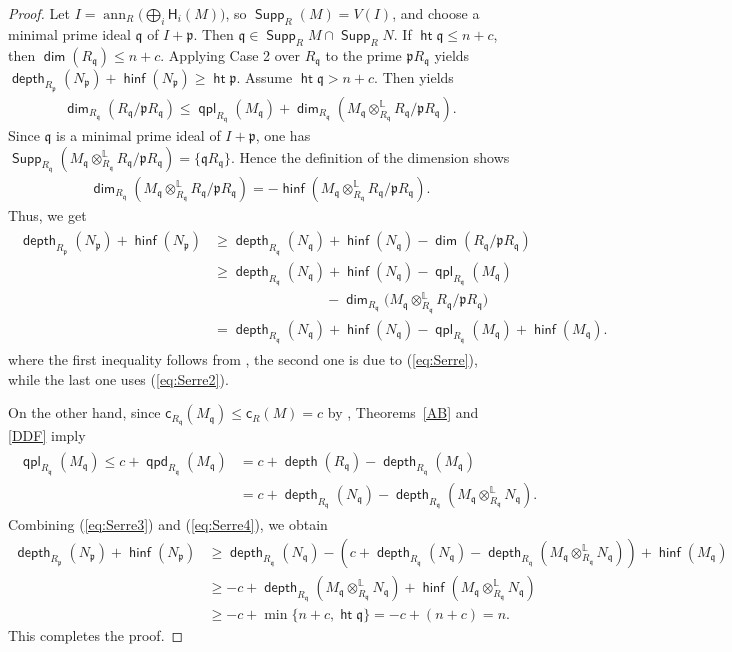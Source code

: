 \documentclass[10pt, a4paper,reqno]{amsart}
\theoremstyle{definition}
\theoremstyle{remark}
\numberwithin{equation}{thm}
\def\fp{\mathfrak{p}}
\def\fq{\mathfrak{q}}
\def\sH{\mathsf{H}}
\def\c{\mathsf{c}}
\def\ann{\operatorname{ann}}
\def\dim{\operatorname{\mathsf{dim}}}
\def\depth{\operatorname{\mathsf{depth}}}
\def\height{\operatorname{\mathsf{ht}}}
\def\Supp{\operatorname{\mathsf{Supp}}}
\def\ltensor{\otimes^{\mathbb{L}}}
\def\hinf{\operatorname{\mathsf{hinf}}}
\def\qpd{\operatorname{\mathsf{qpd}}}
\def\qpl{\operatorname{\mathsf{qpl}}}
\begin{document}
\begin{proof}
Let $I = \ann_R \bigl(\bigoplus_i \sH_i(M)\bigr)$, so $\Supp_R(M)=V(I)$, and choose a minimal prime ideal $\fq$ of $I + \fp$.
Then $\fq\in\Supp_R M\cap\Supp_R N$.
If $\height \fq \le n+c$, then $\dim(R_\fq) \le n+c$. 
Applying Case 2 over $R_\fq$ to the prime $\fp R_\fq$ yields $\depth_{R_\fp}(N_\fp) + \hinf(N_\fp) \ge \height \fp$.
Assume $\height \fq > n+c$.
Then  yields
\begin{align}\label{eq:Serre}
\dim_{R_\fq}(R_\fq/\fp R_\fq) \le \qpl_{R_\fq}(M_\fq) + \dim_{R_\fq}(M_\fq \ltensor_{R_\fq} R_\fq/\fp R_\fq).
\end{align}
Since $\fq$ is a minimal prime ideal of $I + \fp$, one has $\Supp_{R_\fq}(M_\fq \ltensor_{R_\fq} R_\fq/\fp R_\fq)  = \{\fq R_\fq\}$.
Hence the definition of the dimension shows 
\begin{align}\label{eq:Serre2}
\dim_{R_\fq}(M_\fq \ltensor_{R_\fq} R_\fq/\fp R_\fq) = - \hinf(M_\fq \ltensor_{R_\fq} R_\fq/\fp R_\fq).	
\end{align}
Thus, we get 
\begin{align}\label{eq:Serre3}
\begin{split}
\depth_{R_\fp}(N_\fp)+\hinf(N_\fp)
&\geq \depth_{R_\fq}(N_\fq)+\hinf(N_\fq)
-\dim(R_\fq/\fp R_\fq)\\
&\geq \depth_{R_\fq}(N_\fq)+\hinf(N_\fq) -\qpl_{R_\fq}(M_\fq)\\
&\qquad\qquad\qquad\qquad
-\dim_{R_\fq}\bigl(M_\fq\ltensor_{R_\fq}R_\fq/\fp R_\fq\bigr)\\
&=\depth_{R_\fq}(N_\fq)+\hinf(N_\fq)
-\qpl_{R_\fq}(M_\fq)+\hinf(M_\fq).
\end{split}
\end{align}
where the first inequality follows from \cite[Lemma A.6.2]{Gbook}, the second one is due to (\ref{eq:Serre}), while the last one uses (\ref{eq:Serre2}).

On the other hand, since $\c_{R_\fq}(M_\fq) \le \c_{R}(M) = c$ by , Theorems~\ref{AB} and \ref{DDF} imply
\begin{align}\label{eq:Serre4}
\begin{split}
\qpl_{R_\fq}(M_\fq) \le c + \qpd_{R_\fq}(M_\fq) &= c + \depth(R_\fq) - \depth_{R_\fq}(M_\fq) \\
&= c + \depth_{R_\fq}(N_\fq) - \depth_{R_\fq}(M_\fq \ltensor_{R_\fq} N_\fq).
\end{split}
\end{align}
Combining (\ref{eq:Serre3}) and (\ref{eq:Serre4}), we obtain
\begin{align*}
\depth_{R_\fp}(N_\fp) + \hinf(N_\fp) &\ge \depth_{R_\fq}(N_\fq) - (c + \depth_{R_\fq}(N_\fq) - \depth_{R_\fq}(M_\fq \ltensor_{R_\fq} N_\fq)) + \hinf(M_\fq) \\
&\ge -c + \depth_{R_\fq}(M_\fq \ltensor_{R_\fq} N_\fq) + \hinf(M_\fq \ltensor_{R_\fq} N_\fq) \\
&\ge -c + \min\{n+c, \height \fq\} = - c + (n+c) = n.  
\end{align*}
This completes the proof.
\end{proof}
\end{document}
